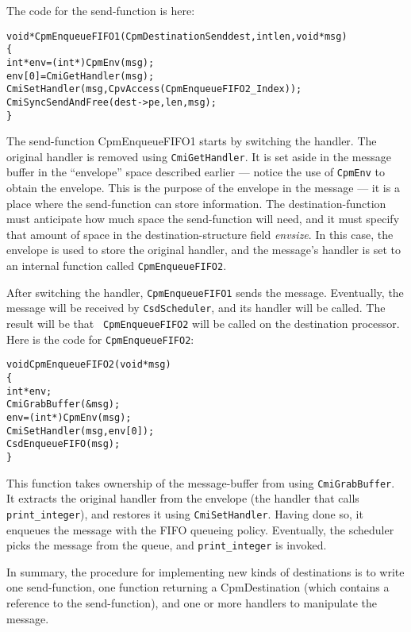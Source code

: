 The code for the send-function is here:

\begin{alltt}
void *CpmEnqueueFIFO1(CpmDestinationSend dest, int len, void *msg)
\{
  int *env = (int *)CpmEnv(msg);
  env[0] = CmiGetHandler(msg);
  CmiSetHandler(msg, CpvAccess(CpmEnqueueFIFO2_Index));
  CmiSyncSendAndFree(dest->pe,len,msg);
\}
\end{alltt}

The send-function CpmEnqueueFIFO1 starts by switching the handler.
The original handler is removed using {\tt CmiGetHandler}.  It
is set aside in the message buffer in the ``envelope'' space described
earlier --- notice the use of {\tt CpmEnv} to obtain the envelope.
This is the purpose of the envelope in the message --- it is a place
where the send-function can store information.  The
destination-function must anticipate how much space the send-function
will need, and it must specify that amount of space in the
destination-structure field {\it envsize}.  In this case, the envelope
is used to store the original handler, and the message's handler is
set to an internal function called {\tt CpmEnqueueFIFO2}.

After switching the handler, {\tt CpmEnqueueFIFO1} sends the message.
Eventually, the message will be received by {\tt CsdScheduler}, and
its handler will be called.  The result will be that {\tt
CpmEnqueueFIFO2} will be called on the destination processor.  Here is
the code for {\tt CpmEnqueueFIFO2}:

\begin{alltt}
void CpmEnqueueFIFO2(void *msg)
\{
  int *env;
  CmiGrabBuffer(&msg);
  env = (int *)CpmEnv(msg);
  CmiSetHandler(msg, env[0]);
  CsdEnqueueFIFO(msg);
\}
\end{alltt}

This function takes ownership of the message-buffer from \converse{}
using {\tt CmiGrabBuffer}.  It extracts the original handler from the
envelope (the handler that calls {\tt print\_integer}), and restores it
using {\tt CmiSetHandler}.  Having done so, it enqueues the message
with the FIFO queueing policy.  Eventually, the scheduler picks the
message from the queue, and {\tt print\_integer} is invoked.

In summary, the procedure for implementing new kinds of destinations
is to write one send-function, one function returning a CpmDestination
(which contains a reference to the send-function), and one or more
\converse{} handlers to manipulate the message.

